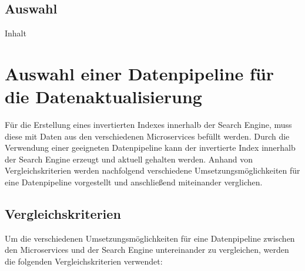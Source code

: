 
\subsection{Auswahl\label{subsec4.2.5:Unterunterpunkt-5}}

Inhalt

\section{Auswahl einer Datenpipeline für die Datenaktualisierung\label{sec4.3:Unterpunkt-3}}

Für die Erstellung eines invertierten Indexes innerhalb der Search Engine, muss diese mit Daten aus den verschiedenen Microservices befüllt werden. Durch die Verwendung einer geeigneten Datenpipeline kann der invertierte Index innerhalb der Search Engine erzeugt und aktuell gehalten werden. Anhand von Vergleichskriterien werden nachfolgend verschiedene Umsetzungsmöglichkeiten für eine Datenpipeline vorgestellt und anschließend miteinander verglichen.

\subsection{Vergleichskriterien\label{subsec4.3.1:Unterunterpunkt-1}}

Um die verschiedenen Umsetzungsmöglichkeiten für eine Datenpipeline zwischen den Microservices und der Search Engine untereinander zu vergleichen, werden die folgenden Vergleichskriterien verwendet:

